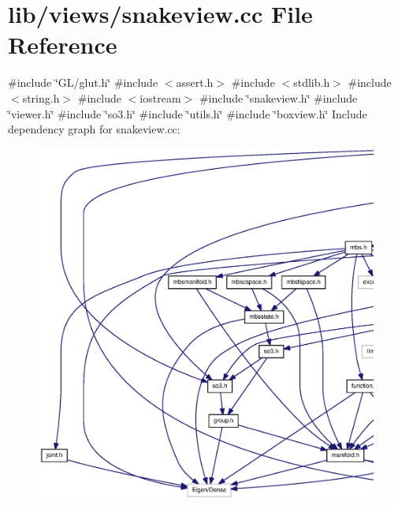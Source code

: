 \section{lib/views/snakeview.cc \-File \-Reference}
\label{snakeview_8cc}
{\ttfamily \#include \char`\"{}\-G\-L/glut.\-h\char`\"{}}\*
{\ttfamily \#include $<$assert.\-h$>$}\*
{\ttfamily \#include $<$stdlib.\-h$>$}\*
{\ttfamily \#include $<$string.\-h$>$}\*
{\ttfamily \#include $<$iostream$>$}\*
{\ttfamily \#include \char`\"{}snakeview.\-h\char`\"{}}\*
{\ttfamily \#include \char`\"{}viewer.\-h\char`\"{}}\*
{\ttfamily \#include \char`\"{}so3.\-h\char`\"{}}\*
{\ttfamily \#include \char`\"{}utils.\-h\char`\"{}}\*
{\ttfamily \#include \char`\"{}boxview.\-h\char`\"{}}\*
\-Include dependency graph for snakeview.\-cc\-:\nopagebreak
\begin{figure}[H]
\begin{center}
\leavevmode
\includegraphics[width=350pt]{snakeview_8cc__incl}
\end{center}
\end{figure}
